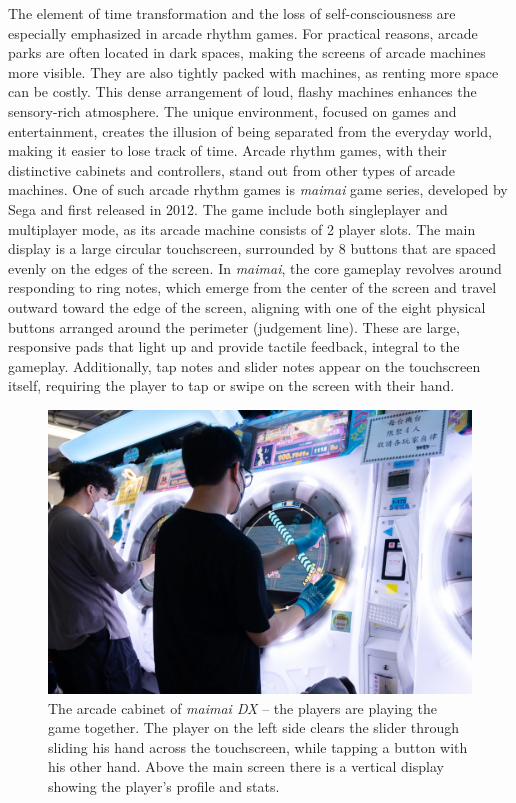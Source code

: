 The element of time transformation and the loss of self-consciousness are especially emphasized in arcade rhythm games. For practical reasons, arcade parks are often located in dark spaces, making the screens of arcade machines more visible. They are also tightly packed with machines, as renting more space can be costly. This dense arrangement of loud, flashy machines enhances the sensory-rich atmosphere. The unique environment, focused on games and entertainment, creates the illusion of being separated from the everyday world, making it easier to lose track of time. Arcade rhythm games, with their distinctive cabinets and controllers, stand out from other types of arcade machines. One of such arcade rhythm games is \textit{maimai} game series, developed by Sega and first released in 2012. The game include both singleplayer and multiplayer mode, as its arcade machine consists of 2 player slots. The main display is a large circular touchscreen, surrounded by 8 buttons that are spaced evenly on the edges of the screen. In \textit{maimai}, the core gameplay revolves around responding to ring notes, which emerge from the center of the screen and travel outward toward the edge of the screen, aligning with one of the eight physical buttons arranged around the perimeter (judgement line). These are large, responsive pads that light up and provide tactile feedback, integral to the gameplay. Additionally, tap notes and slider notes appear on the touchscreen itself, requiring the player to tap or swipe on the screen with their hand. 

\begin{figure}[h]
    \centering\includegraphics[scale=0.4]{obrazki/maimai2.png}
    \caption{The arcade cabinet of \textit{maimai DX} -- the players are playing the game together. The player on the left side clears the slider through sliding his hand across the touchscreen, while tapping a button with his other hand. Above the main screen there is a vertical display showing the player's profile and stats.\cite{maimai1}}
    \label{fig:maimaicabinet}
\end{figure}

